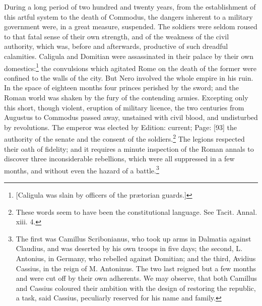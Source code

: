 During a long period of two hundred and twenty years, from the establishment of this artful system to the death of Commodus, the dangers inherent to a military government were, in a great measure, suspended. The soldiers were seldom roused to that fatal sense of their own strength, and of the weakness of the civil authority, which was, before and afterwards, productive of such dreadful calamities. Caligula and Domitian were assassinated in their palace by their own domestics:\footnote{[Caligula was slain by officers of the prætorian guards.]} the convulsions which agitated Rome on the death of the former were confined to the walls of the city. But Nero involved the whole empire in his ruin. In the space of eighteen months four princes perished by the sword; and the Roman world was shaken by the fury of the contending armies. Excepting only this short, though violent, eruption of military licence, the two centuries from Augustus to Commodus passed away, unstained with civil blood, and undisturbed by revolutions. The emperor was elected by Edition: current; Page: [93] the authority of the senate and the consent of the soldiers.\footnote{These words seem to have been the constitutional language. See Tacit. Annal. xiii. 4.} The legions respected their oath of fidelity; and it requires a minute inspection of the Roman annals to discover three inconsiderable rebellions, which were all suppressed in a few months, and without even the hazard of a battle.\footnote{The first was Camillus Scribonianus, who took up arms in Dalmatia against Claudius, and was deserted by his own troops in five days; the second, L. Antonius, in Germany, who rebelled against Domitian; and the third, Avidius Cassius, in the reign of M. Antoninus. The two last reigned but a few months and were cut off by their own adherents. We may observe, that both Camillus and Cassius coloured their ambition with the design of restoring the republic, a task, said Cassius, peculiarly reserved for his name and family.}

